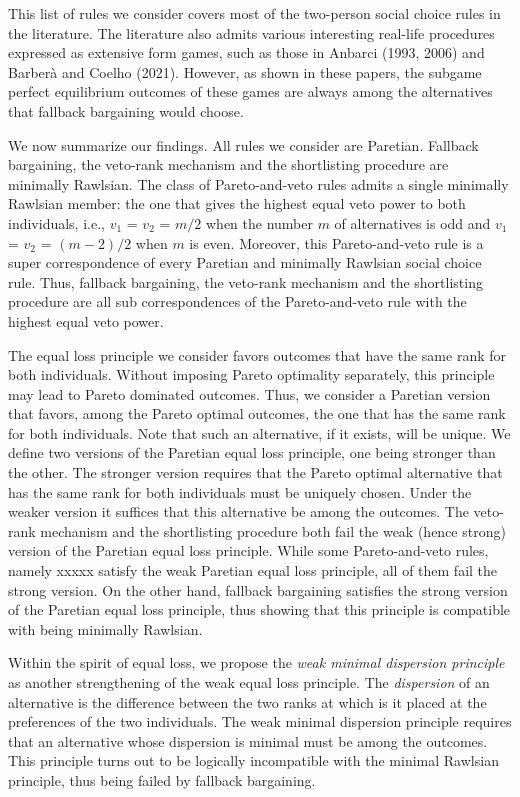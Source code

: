 \documentclass[version=3.21, pagesize, twoside=off, bibliography=totoc, DIV=calc, fontsize=12pt, a4paper]{scrartcl}
\begin{document}
This list of rules we consider covers most of the two-person social choice rules in the literature. The literature also admits various interesting real-life procedures expressed as extensive form games, such as those in Anbarci (1993, 2006) and Barberà and Coelho (2021). However, as shown in these papers, the subgame perfect equilibrium outcomes of these games are always among the alternatives that fallback bargaining would choose. 

We now summarize our findings. All rules we consider are Paretian. Fallback bargaining, the veto-rank mechanism and the shortlisting procedure are minimally Rawlsian. The class of Pareto-and-veto rules admits a single minimally Rawlsian member: the one that gives the highest equal veto power to both individuals, i.e., $v_1$ = $v_2$ = $m/2$ when the number $m$ of alternatives is odd and $v_1$ = $v_2$ = $(m-2)/2$ when $m$ is even. Moreover, this Pareto-and-veto rule is a super correspondence of every Paretian and minimally Rawlsian social choice rule. Thus, fallback bargaining, the veto-rank mechanism and the shortlisting procedure are all sub correspondences of the Pareto-and-veto rule with the highest equal veto power.

The equal loss principle we consider favors outcomes that have the same rank for both individuals. Without imposing Pareto optimality separately, this principle may lead to Pareto dominated outcomes. Thus, we consider a Paretian version that favors, among the Pareto optimal outcomes, the one that has the same rank for both individuals. Note that such an alternative, if it exists, will be unique. We define two versions of the Paretian equal loss principle, one being stronger than the other. The stronger version requires that the Pareto optimal alternative that has the same rank for both individuals must be uniquely chosen. Under the weaker version it suffices that this alternative be among the outcomes. The veto-rank mechanism and the shortlisting procedure both fail the weak (hence strong) version of the Paretian equal loss principle.  While some Pareto-and-veto rules, namely xxxxx satisfy the weak Paretian equal loss principle, all of them fail the strong version. On the other hand, fallback bargaining satisfies the strong version of the Paretian equal loss principle, thus showing that this principle is compatible with being minimally Rawlsian. 



Within the spirit of equal loss, we propose the \textit{weak minimal dispersion principle} as another strengthening of the weak equal loss principle. The \textit{dispersion} of an alternative is the difference between the two ranks at which is it placed at the preferences of the two individuals. The weak minimal dispersion principle requires that an alternative whose dispersion is minimal must be among the outcomes. This principle turns out to be logically incompatible with the minimal Rawlsian principle, thus being failed by fallback bargaining.
\end{document}
